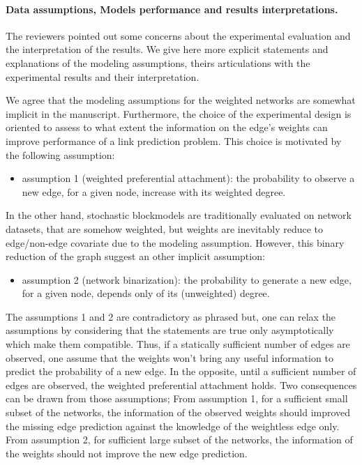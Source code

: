 \documentclass{article}
\begin{document}
\paragraph{Data assumptions, Models performance and results interpretations.}


The reviewers pointed out some concerns about the experimental evaluation and the interpretation of the results. We give here more explicit statements and explanations of the modeling assumptions, theirs articulations with the experimental results and their interpretation.

We agree that the modeling assumptions for the weighted networks are somewhat implicit in the manuscript. Furthermore, the choice of the experimental design is oriented to assess to what extent the information on the edge's weights can improve performance of a link prediction problem. This choice is motivated by the following assumption:
\begin{itemize}
\item assumption 1 (weighted preferential attachment): the probability to observe a new edge, for a given node, increase with its weighted degree. 
\end{itemize}

In the other hand, stochastic blockmodels are traditionally evaluated on network datasets, that are somehow weighted, but weights are inevitably reduce to edge/non-edge covariate due to the modeling assumption. However, this binary reduction of the graph suggest an other implicit assumption: 
\begin{itemize}
\item assumption 2 (network binarization): the probability to generate a new edge, for a given node, depends only of its (unweighted) degree.
\end{itemize}

The assumptions 1 and 2 are contradictory as phrased but, one can relax the assumptions by considering that the statements are true only asymptotically which make them compatible. Thus, if a statically sufficient number of edges are observed, one assume that the weights won't bring any useful information to predict the probability of a new edge. In the opposite, until a sufficient number of edges are observed, the weighted preferential attachment holds. Two consequences can be drawn from those assumptions; From assumption 1, for a sufficient small subset of the networks, the information of the observed weights should improved the missing edge prediction against the knowledge of the weightless edge only. From assumption 2, for sufficient large subset of the networks, the information of the weights should not improve the new edge prediction.
\end{document}
